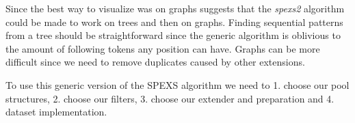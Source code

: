 Since the best way to visualize was on graphs suggests that the \emph{spexs2} algorithm could be made to work on trees and then on graphs. Finding sequential patterns from a tree should be straightforward since the generic algorithm is oblivious to the amount of following tokens any position can have. Graphs can be more difficult since we need to remove duplicates caused by other extensions.

To use this generic version of the SPEXS algorithm we need to 1. choose our pool structures, 2. choose our filters, 3. choose our extender and preparation and 4. dataset implementation.
